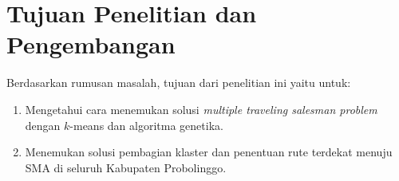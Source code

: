 \section{Tujuan Penelitian dan Pengembangan}

Berdasarkan rumusan masalah, tujuan dari penelitian ini yaitu untuk:
\begin{enumerate}
	\item Mengetahui cara menemukan solusi \textit{multiple traveling salesman problem} dengan $k$-means dan algoritma genetika.
	\item Menemukan solusi pembagian klaster dan penentuan rute terdekat menuju SMA di seluruh Kabupaten Probolinggo.
\end{enumerate}

